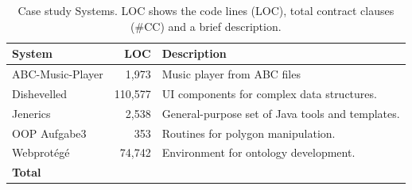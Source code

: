 

\begin{table}[ht]
\caption{Case study Systems. LOC shows the code lines (LOC), total contract clauses (\#CC) and a brief description.}
\label{tab:Units}
\centering
\begin{tabular}{lrl}
\toprule
\bfseries System &  \bfseries LOC & 
\bfseries Description  \\ \hline
ABC-Music-Player & 1,973 & Music player from ABC files  \\ 
Dishevelled & 110,577 & UI components for complex data structures.\\ 
Jenerics & 2,538 &  General-purpose set of Java tools and templates.\\ 
OOP Aufgabe3 & 353 &  Routines for polygon manipulation.\\
Webprot\'{e}g\'{e} & 74,742 & Environment for ontology development. \\ \hline

 \bfseries Total &  \bfseries \totalCode{} & \\
\bottomrule
\end{tabular}
\end{table}

